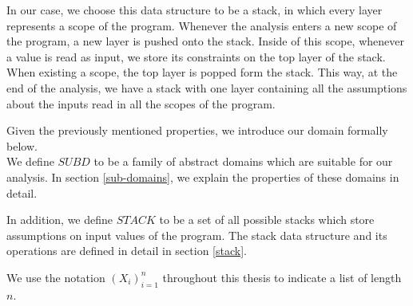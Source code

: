 \documentclass[]{report}
\begin{document}
In our case, we choose this data structure to be a stack, in which every layer represents a scope of the program. Whenever the analysis enters a new scope of the program, a new layer is pushed onto the stack. Inside of this scope, whenever a value is read as input, we store its constraints on the top layer of the stack. When existing a scope, the top layer is popped form the stack. This way, at the end of the analysis, we have a stack with one layer containing all the assumptions about the inputs read in all the scopes of the program. 

Given the previously mentioned properties, we introduce our domain formally below. \\


We define $SUBD$ to be a family of abstract domains which are suitable for our analysis. In section \ref{sub-domains}, we explain the properties of these domains in detail.  

In addition, we define $STACK$ to be a set of all possible stacks which store assumptions on input values of the program. The stack data structure and its operations are defined in detail in section \ref{stack}. 

We use the notation $ (X_{i})_{i=1}^{n} $ throughout this thesis to indicate a list of length $ n $.  \\
\end{document}
